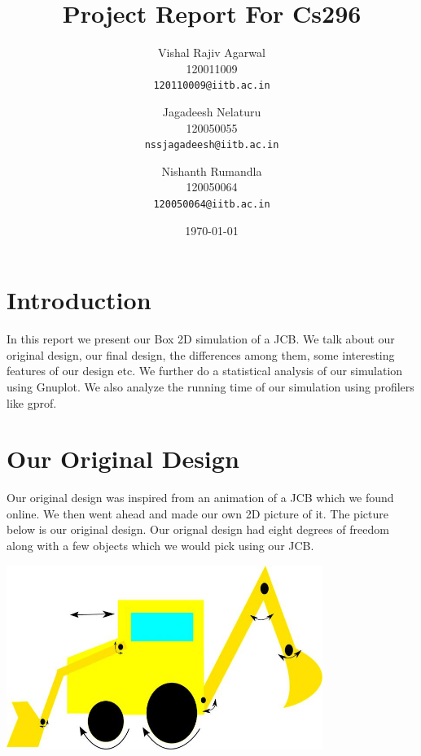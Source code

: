\documentclass[11pt]{article}
\begin{document}
\title{Project Report For Cs296}

\author{
	Vishal Rajiv Agarwal\\
	120011009\\
	\texttt{120110009@iitb.ac.in}
	\and
	Jagadeesh Nelaturu\\
	120050055\\
	\texttt{nssjagadeesh@iitb.ac.in}
	\and
	Nishanth Rumandla\\
	120050064\\
	\texttt{120050064@iitb.ac.in}}

\date{\today}

\maketitle

\section{Introduction}
	In this report we present our Box 2D simulation of a JCB. We talk about our original design, our final design, the differences among them, some interesting features of our design etc. We further do a statistical analysis of our simulation using Gnuplot. We also analyze the running time of our simulation using profilers like gprof.  
\section{Our Original Design}
	Our original design was inspired from an animation of a JCB which we found online. We then went ahead and made our own 2D picture of it. The picture below is our original design. Our orignal design had eight degrees of freedom along with a few objects which we would pick using our JCB. 
	\begin{center}\includegraphics[height=6cm]{BullDozerDesign.jpg}\end{center}
\end{document}
